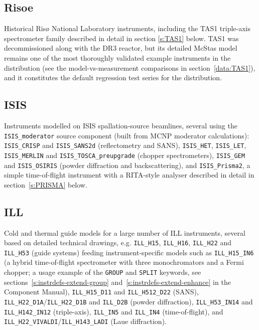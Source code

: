 \subsection{Risoe}

Historical Risø National Laboratory instruments, including the TAS1
triple-axis spectrometer family described in detail in section
\ref{s:TAS1} below. TAS1 was decommissioned along with the DR3 reactor, but
its detailed McStas model remains one of the most thoroughly
validated example instruments in the distribution (see the model-vs-measurement
comparisons in section~\ref{data:TAS1}), and it constitutes the default
regression test series for the \MCS distribution.

\subsection{ISIS}

Instruments modelled on ISIS spallation-source beamlines, several using the
\texttt{ISIS\_moderator} source component (built from MCNP moderator
calculations): \texttt{ISIS\_CRISP} and \texttt{ISIS\_SANS2d} (reflectometry
and SANS), \texttt{ISIS\_HET}, \texttt{ISIS\_LET}, \texttt{ISIS\_MERLIN} and
\texttt{ISIS\_TOSCA\_preupgrade} (chopper spectrometers), \texttt{ISIS\_GEM}
and \texttt{ISIS\_OSIRIS} (powder diffraction and backscattering), and
\texttt{ISIS\_Prisma2}, a simple time-of-flight instrument with a RITA-style
analyser described in detail in section~\ref{s:PRISMA} below.

\subsection{ILL}

Cold and thermal guide models for a large number of ILL instruments,
several based on detailed technical drawings, e.g. \texttt{ILL\_H15},
\texttt{ILL\_H16}, \texttt{ILL\_H22} and \texttt{ILL\_H53} (guide systems)
feeding instrument-specific models such as \texttt{ILL\_H15\_IN6} (a
hybrid time-of-flight spectrometer with three monochromators and a Fermi
chopper; a usage example of the \texttt{GROUP} and \texttt{SPLIT} keywords,
see sections~\ref{s:instrdefs-extend-group} and~\ref{s:instrdefs-extend-enhance}
in the Component Manual), \texttt{ILL\_H15\_D11} and \texttt{ILL\_H512\_D22}
(SANS), \texttt{ILL\_H22\_D1A}/\texttt{ILL\_H22\_D1B} and \texttt{ILL\_D2B}
(powder diffraction), \texttt{ILL\_H53\_IN14} and \texttt{ILL\_H142\_IN12}
(triple-axis), \texttt{ILL\_IN5} and \texttt{ILL\_IN4} (time-of-flight),
and \texttt{ILL\_H22\_VIVALDI}/\texttt{ILL\_H143\_LADI} (Laue diffraction).

